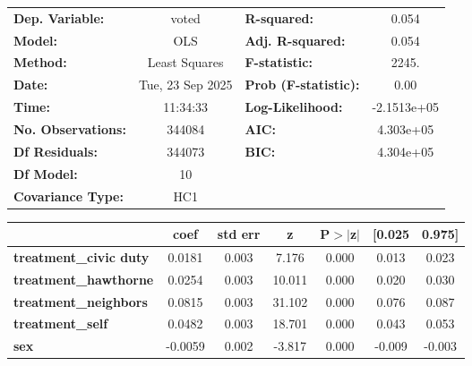 \begin{center}
\begin{tabular}{lclc}
\toprule
\textbf{Dep. Variable:}        &      voted       & \textbf{  R-squared:         } &      0.054   \\
\textbf{Model:}                &       OLS        & \textbf{  Adj. R-squared:    } &      0.054   \\
\textbf{Method:}               &  Least Squares   & \textbf{  F-statistic:       } &      2245.   \\
\textbf{Date:}                 & Tue, 23 Sep 2025 & \textbf{  Prob (F-statistic):} &      0.00    \\
\textbf{Time:}                 &     11:34:33     & \textbf{  Log-Likelihood:    } & -2.1513e+05  \\
\textbf{No. Observations:}     &      344084      & \textbf{  AIC:               } &  4.303e+05   \\
\textbf{Df Residuals:}         &      344073      & \textbf{  BIC:               } &  4.304e+05   \\
\textbf{Df Model:}             &          10      & \textbf{                     } &              \\
\textbf{Covariance Type:}      &       HC1        & \textbf{                     } &              \\
\bottomrule
\end{tabular}
\begin{tabular}{lcccccc}
                               & \textbf{coef} & \textbf{std err} & \textbf{z} & \textbf{P$> |$z$|$} & \textbf{[0.025} & \textbf{0.975]}  \\
\midrule
\textbf{treatment\_civic duty} &       0.0181  &        0.003     &     7.176  &         0.000        &        0.013    &        0.023     \\
\textbf{treatment\_hawthorne}  &       0.0254  &        0.003     &    10.011  &         0.000        &        0.020    &        0.030     \\
\textbf{treatment\_neighbors}  &       0.0815  &        0.003     &    31.102  &         0.000        &        0.076    &        0.087     \\
\textbf{treatment\_self}       &       0.0482  &        0.003     &    18.701  &         0.000        &        0.043    &        0.053     \\
\textbf{sex}                   &      -0.0059  &        0.002     &    -3.817  &         0.000        &       -0.009    &       -0.003     \\

\end{tabular}
\end{center}
